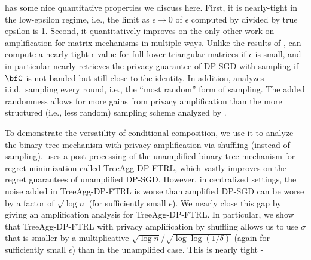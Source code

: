 \MMCC{} has some nice quantitative properties we discuss here. First, it is nearly-tight in the low-epsilon regime, i.e., the limit as $\epsilon \rightarrow 0$ of $\epsilon$ computed by \MMCC{} divided by true epsilon is 1. Second, it quantitatively improves on the only other work on amplification for matrix mechanisms \citep{BandedMF} in multiple ways. Unlike the results of \citet{BandedMF}, \MMCC{} can compute a nearly-tight $\epsilon$ value for full lower-triangular matrices if $\epsilon$ is small, and in particular nearly retrieves the privacy guarantee of DP-SGD with sampling if $\bfC$ is not banded but still close to the identity. In addition, \MMCC{} analyzes i.i.d.~sampling every round, i.e., the ``most random'' form of sampling. The added randomness allows for more gains from privacy amplification than the more structured (i.e., less random) sampling scheme analyzed by \cite{BandedMF}.

 To demonstrate the versatility of conditional composition, we use it to analyze the binary tree mechanism with privacy amplification via shuffling (instead of sampling). \cite{kairouz2021practical} uses a post-processing of the unamplified binary tree mechanism for regret minimization called TreeAgg-DP-FTRL, which vastly improves on the regret guarantees of unamplified DP-SGD. However, in centralized settings, the noise added in TreeAgg-DP-FTRL is worse than amplified DP-SGD can be worse by a factor of $\sqrt{\log n}$ (for sufficiently small $\epsilon$). We nearly close this gap by giving an amplification analysis for TreeAgg-DP-FTRL. In particular, we show that TreeAgg-DP-FTRL with privacy amplification by shuffling allows us to use $\sigma$ that is smaller by a multiplicative $\sqrt{\log n} / \sqrt{\log \log (1/\delta)}$ (again for sufficiently small $\epsilon$) than in the unamplified case. This is nearly tight - 

